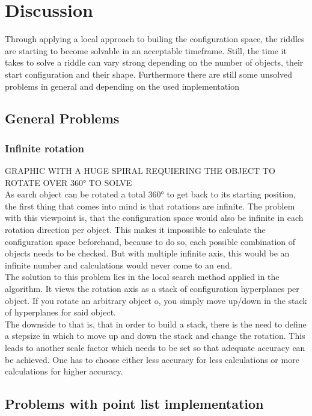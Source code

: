 \chapter{Discussion}
Through applying a local approach to builing the configuration space, the riddles are starting to become solvable in an acceptable timeframe.
Still, the time it takes to solve a riddle can vary strong depending on the number of objects, their start configuration and their shape. Furthermore there are still some unsolved problems in general and depending on the used implementation

\section{General Problems}
\subsection{Infinite rotation}
GRAPHIC WITH A HUGE SPIRAL REQUIERING THE OBJECT TO ROTATE OVER 360° TO SOLVE\\
As earch object can be rotated a total 360° to get back to its starting position, the first thing that comes into mind is that rotations are infinite. The problem with this viewpoint is, that the configuration space would also be infinite in each rotation direction per object. This makes it impossible to calculate the configuration space beforehand, because to do so, each possible combination of objects needs to be checked. But with multiple infinite axis, this would be an infinite number and calculations would never come to an end. \\
The solution to this problem lies in the local search method applied in the algorithm. It views the rotation axis as a stack of configuration hyperplanes per object. If you rotate an arbitrary object o, you simply move up/down in the stack of hyperplanes for said object. \\
The downside to that is, that in order to build a stack, there is the need to define a stepsize in which to move up and down the stack and change the rotation. This leads to another scale factor which needs to be set so that adequate accuracy can be achieved. One has to choose either less accuracy for less calculations or more calculations for higher accuracy.


\section{Problems with point list implementation}
